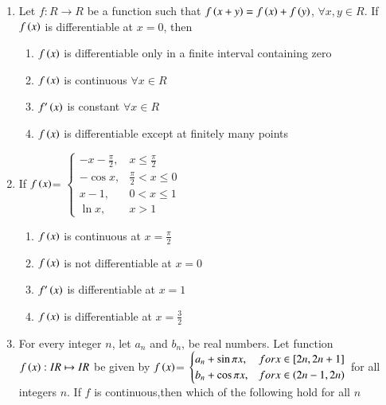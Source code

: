 \documentclass[journal,12pt,twocolumn]{IEEEtran}
\theoremstyle{remark}
\begin{document}
\begin{enumerate}
    \item 
    {Let $f:R \to R$ be a function such that $f\left(x+y\right)=f\left(x\right)+f\left(y\right)$, $\forall x,y\in R$. If $f\left(x\right)$ is differentiable at $x=0$, then} 

    \hfill 
    {}
    
    \begin{enumerate}[label=(\alph*)]
        
        \item $f\left(x\right)$ is differentiable only in a finite interval containing zero 
        \item $f\left(x\right)$ is continuous $\forall x\in R$
        \item $f'\left(x\right)$ is constant $\forall x\in R$
        \item $f\left(x\right)$ is differentiable except at finitely many points 
    \end{enumerate}


    \item 
    {If $f\left(x\right)$= 
    $\begin{cases}
        -x-\frac{\pi}{2}, & x\leq \frac{\pi}{2} \\
        -\cos x, & \frac{\pi}{2}<x\leq 0 \\
        x-1, & 0<x\leq1 \\
        \ln x, & x>1
    \end{cases}$} 

    \hfill 
    {}
    
    \begin{enumerate}[label=(\alph*)]
        
        \item $f\left(x\right)$ is continuous at $x=\frac{\pi}{2}$
        \item $f\left(x\right)$ is not differentiable at $x=0$
        \item $f'\left(x\right)$ is differentiable at $x=1$
        \item $f\left(x\right)$ is differentiable at $x=\frac{3}{2}$
    \end{enumerate}


    \item 
    {For every integer $n$, let $a_n$ and $b_n$, be real numbers. Let function $f\left(x\right): IR \mapsto IR$ be given by
    $f\left(x\right)$= 
    $\begin{cases}
       a_n+\sin\pi x, & for x\in [2n,2n+1] \\
       b_n+\cos\pi x, & for x\in \left(2n-1,2n\right)
    \end{cases}$
    for all integers $n$. If $f$ is continuous,then which of the following hold for all $n$} 


\end{enumerate}
\end{document}
